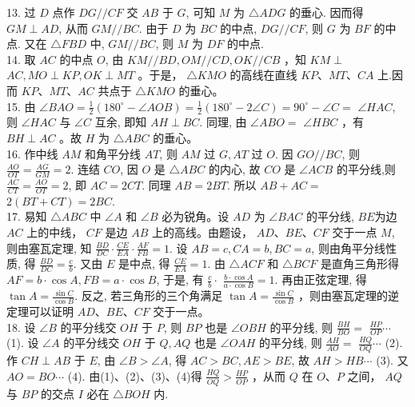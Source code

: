 \documentclass[10pt]{article}
\begin{document}
13. 过 $D$ 点作 $D G / / C F$ 交 $A B$ 于 $G$, 可知 $M$ 为 $\triangle A D G$ 的垂心. 因而得 $G M \perp A D$, 从而 $G M / / B C$. 由于 $D$ 为 $B C$ 的中点, $D G / / C F$, 则 $G$ 为 $B F$ 的中点. 又在 $\triangle F B D$ 中, $G M / / B C$, 则 $M$ 为 $D F$ 的中点.\\
14. 取 $A C$ 的中点 $O$, 由 $K M / / B D, O M / / C D, O K / / C B$ ，知 $K M \perp$ $A C, M O \perp K P, O K \perp M T$ 。于是， $\triangle K M O$ 的高线在直线 $K P 、 M T 、 C A$ 上.因而 $K P 、 M T 、 A C$ 共点于 $\triangle K M O$ 的垂心。\\
15. 由 $\angle B A O=\frac{1}{2}\left(180^{\circ}-\angle A O B\right)=\frac{1}{2}\left(180^{\circ}-2 \angle C\right)=90^{\circ}-\angle C=$ $\angle H A C$, 则 $\angle H A C$ 与 $\angle C$ 互余, 即知 $A H \perp B C$. 同理, 由 $\angle A B O=$ $\angle H B C$ ，有 $B H \perp A C$ 。故 $H$ 为 $\triangle A B C$ 的垂心。\\
16. 作中线 $A M$ 和角平分线 $A T$, 则 $A M$ 过 $G, A T$ 过 $O$. 因 $G O / / B C$, 则\\
$\frac{A O}{O T}=\frac{A G}{G M}=2$. 连结 $C O$, 因 $O$ 是 $\triangle A B C$ 的内心, 故 $C O$ 是 $\angle A C B$ 的平分线,则 $\frac{A C}{C T}=\frac{A O}{O T}=2$, 即 $A C=2 C T$. 同理 $A B=2 B T$. 所以 $A B+A C=$ $2(B T+C T)=2 B C$.\\
17. 易知 $\triangle A B C$ 中 $\angle A$ 和 $\angle B$ 必为锐角。设 $A D$ 为 $\angle B A C$ 的平分线, $B E$为边 $A C$ 上的中线， $C F$ 是边 $A B$ 上的高线。由题设， $A D 、 B E 、 C F$ 交于一点 $M$, 则由塞瓦定理, 知 $\frac{B D}{D C} \cdot \frac{C E}{E A} \cdot \frac{A F}{F B}=1$. 设 $A B=c, C A=b, B C=a$, 则由角平分线性质, 得 $\frac{B D}{D C}=\frac{c}{b}$. 又由 $E$ 是中点, 得 $\frac{C E}{E A}=1$. 由 $\triangle A C F$ 和 $\triangle B C F$ 是直角三角形得 $A F=b \cdot \cos A, F B=a \cdot \cos B$, 于是, 有 $\frac{c}{b} \cdot$ $\frac{b \cdot \cos A}{a \cdot \cos B}=1$. 再由正弦定理, 得 $\tan A=\frac{\sin C}{\cos B}$. 反之, 若三角形的三个角满足 $\tan A=\frac{\sin C}{\cos B}$ ，则由塞瓦定理的逆定理可以证明 $A D 、 B E 、 C F$ 交于一点。\\
18. 设 $\angle B$ 的平分线交 $O H$ 于 $P$, 则 $B P$ 也是 $\angle O B H$ 的平分线, 则 $\frac{B H}{B O}=$ $\frac{H P}{O P} \cdots$ (1). 设 $\angle A$ 的平分线交 $O H$ 于 $Q, A Q$ 也是 $\angle O A H$ 的平分线, 则 $\frac{A H}{A O}=$ $\frac{H Q}{O Q} \cdots$ (2). 作 $C H \perp A B$ 于 $E$, 由 $\angle B>\angle A$, 得 $A C>B C, A E>B E$, 故 $A H>H B \cdots$ (3). 又 $A O=B O \cdots$ (4). 由(1)、(2)、(3)、(4)得 $\frac{H Q}{O Q}>\frac{H P}{O P}$ ，从而 $Q$ 在 $O 、 P$ 之间， $A Q$ 与 $B P$ 的交点 $I$ 必在 $\triangle B O H$ 内.
\end{document}
